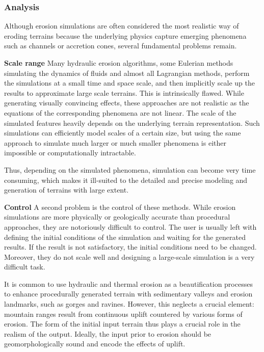 \documentclass{article}
\begin{document}
\subsubsection{Analysis}

Although erosion simulations are often considered the most realistic way of eroding terrains because the underlying physics capture emerging phenomena such as channels or accretion cones, several fundamental problems remain.

\textbf{Scale range} Many hydraulic erosion algorithms, some Eulerian methods simulating the dynamics of fluids and almost all Lagrangian methods, perform the simulations at a small time and space scale, and then implicitly scale up the results to approximate large scale terrains. This is intrinsically flawed. While generating visually convincing effects, these approaches are not realistic as the equations of the corresponding phenomena are not linear. The scale of the simulated features heavily depends on the underlying terrain representation. Such simulations can efficiently model scales of a certain size, but using the same approach to simulate much larger or much smaller phenomena is either impossible or computationally intractable.

Thus, depending on the simulated phenomena, simulation can become very time consuming, which makes it ill-suited to the detailed and precise modeling and generation of terrains with large extent.

\textbf{Control} A second problem is the control of these methods. While erosion simulations are more physically or geologically accurate than procedural approaches, they are notoriously difficult to control. The user is usually left with defining the initial conditions of the simulation and waiting for the generated results. If the result is not satisfactory, the initial conditions need to be changed. Moreover, they do not scale well and designing a large-scale simulation is a very difficult task.

It is common to use hydraulic and thermal erosion as a beautification processes to enhance procedurally generated terrain with sedimentary valleys and erosion landmarks, such as gorges and ravines. However, this neglects a crucial element: mountain ranges result from continuous uplift countered by various forms of erosion. The form of the initial input terrain thus plays a crucial role in the realism of the output. Ideally, the input prior to erosion should be geomorphologically sound and encode the effects of uplift.
\end{document}
